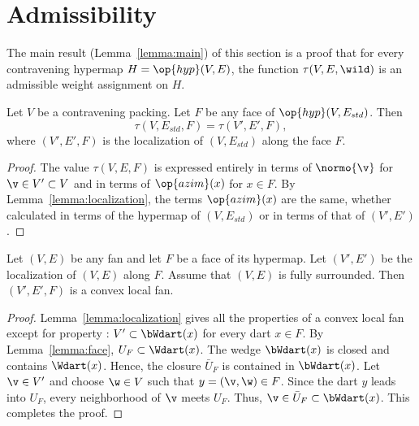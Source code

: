 \section{Admissibility}




The main result (Lemma~\ref{lemma:main}) of this section is a proof
that for every contravening hypermap $H=\op{hyp}(V,E)$, the function
$\tau(V,E,\wild)$ is an admissible weight assignment on $H$.



\begin{lemma}[]  \label{lemma:tau-local}
  Let $V$ be a contravening packing.
  Let $F$ be any face of $\op{hyp}(V,E_{std})$.  Then
\[ 
\tau(V,E_{std},F) = \tau(V',E',F),
\] 
where $(V',E',F)$ is the localization of $(V,E_{std})$ along the face $F$.
\end{lemma}

\begin{proof} The value $\tau(V,E,F)$ is expressed entirely in terms
  of $\normo{\v}$ for $\v\in V'\subset V$ and in terms of
  $\op{azim}(x)$ for $x\in F$.  By Lemma~\ref{lemma:localization},
  the terms $\op{azim}(x)$ are the same, whether calculated in terms
  of the hypermap of $(V,E_{std})$ or in terms of that of $(V',E')$.
\end{proof}


\begin{lemma}[] Let $(V,E)$ be any fan and
  let $F$ be a face of its hypermap.  Let $(V',E')$ be the
  localization of $(V,E)$ along $F$.  Assume that $(V,E)$ is fully surrounded.
  Then $(V',E',F)$ is a convex local fan.
\end{lemma}

\begin{proof}
  Lemma~\ref{lemma:localization} gives all the properties of a convex local fan except for property : $V'\subset \bWdart(x)$ for
  every dart $x\in F$.  By Lemma~\ref{lemma:face}, $U_F \subset
  \Wdart(x)$.  The wedge $\bWdart(x)$ is closed and contains
  $\Wdart(x)$. Hence, the closure $\bar U_F$ is contained in
  $\bWdart(x)$.  Let $\v\in V'$ and choose $\w\in V$ such that
  $y=(\v,\w)\in F$.
  Since the dart $y$ leads into $U_F$, every neighborhood of $\v$
  meets $U_F$.  Thus, $\v\in \bar U_F\subset \bWdart(x)$.  This
  completes the proof.
\end{proof}








